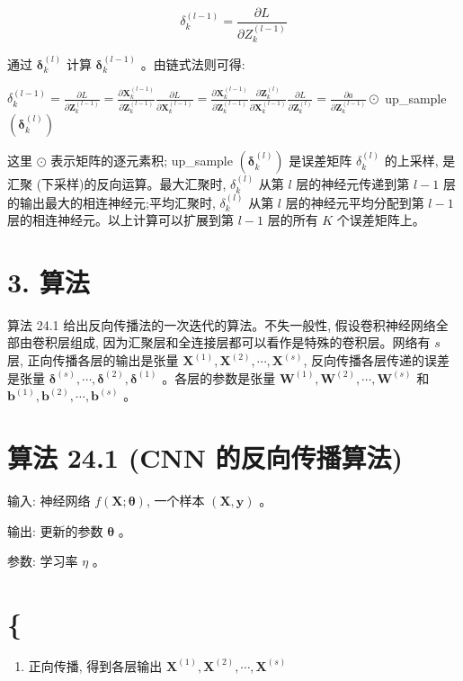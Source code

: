 \documentclass[10pt]{article}
\begin{document}
$$
\delta_{k}^{(l-1)}=\frac{\partial L}{\partial Z_{k}^{(l-1)}}
$$

通过 $\boldsymbol{\delta}_{k}^{(l)}$ 计算 $\boldsymbol{\delta}_{k}^{(l-1)}$ 。由链式法则可得:

$\delta_{k}^{(l-1)}=\frac{\partial L}{\partial \boldsymbol{Z}_{k}^{(l-1)}}=\frac{\partial \boldsymbol{X}_{k}^{(l-1)}}{\partial \boldsymbol{Z}_{k}^{(l-1)}} \frac{\partial L}{\partial \boldsymbol{X}_{k}^{(l-1)}}=\frac{\partial \boldsymbol{X}_{k}^{(l-1)}}{\partial \boldsymbol{Z}_{k}^{(l-1)}} \frac{\partial \boldsymbol{Z}_{k}^{(l)}}{\partial \boldsymbol{X}_{k}^{(l-1)}} \frac{\partial L}{\partial \boldsymbol{Z}_{k}^{(l)}}=\frac{\partial a}{\partial \boldsymbol{Z}_{k}^{(l-1)}} \odot$ up\_sample $\left(\boldsymbol{\delta}_{k}^{(l)}\right)$

这里 $\odot$ 表示矩阵的逐元素积; up\_sample $\left(\boldsymbol{\delta}_{k}^{(l)}\right)$ 是误差矩阵 $\delta_{k}^{(l)}$ 的上采样, 是汇聚 (下采样)的反向运算。最大汇聚时, $\delta_{k}^{(l)}$ 从第 $l$ 层的神经元传递到第 $l-1$ 层的输出最大的相连神经元;平均汇聚时, $\delta_{k}^{(l)}$ 从第 $l$ 层的神经元平均分配到第 $l-1$ 层的相连神经元。以上计算可以扩展到第 $l-1$ 层的所有 $K$ 个误差矩阵上。

\section*{3. 算法}
算法 24.1 给出反向传播法的一次迭代的算法。不失一般性, 假设卷积神经网络全部由卷积层组成, 因为汇聚层和全连接层都可以看作是特殊的卷积层。网络有 $s$ 层, 正向传播各层的输出是张量 $\boldsymbol{X}^{(1)}, \boldsymbol{X}^{(2)}, \cdots, \boldsymbol{X}^{(s)}$, 反向传播各层传递的误差是张量 $\boldsymbol{\delta}^{(s)}, \cdots, \boldsymbol{\delta}^{(2)}, \boldsymbol{\delta}^{(1)}$ 。各层的参数是张量 $\boldsymbol{W}^{(1)}, \boldsymbol{W}^{(2)}, \cdots, \boldsymbol{W}^{(s)}$ 和 $\boldsymbol{b}^{(1)}, \boldsymbol{b}^{(2)}, \cdots, \boldsymbol{b}^{(s)}$ 。

\section*{算法 24.1 (CNN 的反向传播算法)}
输入: 神经网络 $f(\boldsymbol{X} ; \boldsymbol{\theta})$, 一个样本 $(\boldsymbol{X}, \boldsymbol{y})$ 。

输出: 更新的参数 $\boldsymbol{\theta}$ 。

参数: 学习率 $\eta$ 。

\section*{\{}
\begin{enumerate}
  \item 正向传播, 得到各层输出 $\boldsymbol{X}^{(1)}, \boldsymbol{X}^{(2)}, \cdots, \boldsymbol{X}^{(s)}$
\end{enumerate}
\end{document}

